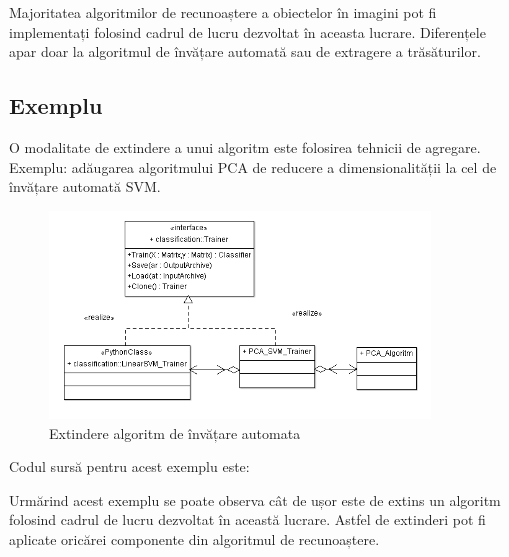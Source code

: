 Majoritatea algoritmilor de recunoaștere a obiectelor în imagini pot fi implementați folosind cadrul de lucru dezvoltat în aceasta lucrare. Diferențele apar doar la algoritmul de învățare automată sau de extragere a trăsăturilor.

\subsection{Exemplu}
O modalitate de extindere a unui algoritm este folosirea tehnicii de agregare.
Exemplu: adăugarea algoritmului PCA de reducere a dimensionalității la cel de învățare automată SVM.

\begin{figure}[H]
	\centering
		\includegraphics[width=0.90\textwidth]{uml/pca_classifier_diagram.png}
	\caption{Extindere algoritm de învățare automata}
	\label{fig:pca_classifier_diagram}
\end{figure}

Codul sursă pentru acest exemplu este:


Urmărind acest exemplu se poate observa cât de ușor este de extins un algoritm folosind cadrul de lucru dezvoltat în această lucrare.
Astfel de extinderi pot fi aplicate oricărei componente din algoritmul de recunoaștere.
%